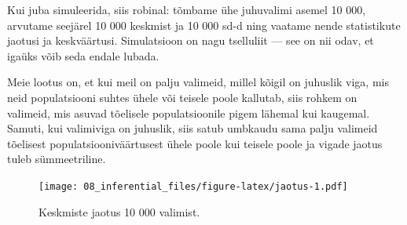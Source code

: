 \documentclass[]{book}
\newenvironment{Shaded}{\begin{snugshade}}{\end{snugshade}}
\newcommand{\CommentTok}[1]{\textcolor[rgb]{0.56,0.35,0.01}{\textit{#1}}}
\newcommand{\DataTypeTok}[1]{\textcolor[rgb]{0.13,0.29,0.53}{#1}}
\newcommand{\DecValTok}[1]{\textcolor[rgb]{0.00,0.00,0.81}{#1}}
\newcommand{\KeywordTok}[1]{\textcolor[rgb]{0.13,0.29,0.53}{\textbf{#1}}}
\newcommand{\NormalTok}[1]{#1}
\newcommand{\OperatorTok}[1]{\textcolor[rgb]{0.81,0.36,0.00}{\textbf{#1}}}
\newcommand{\StringTok}[1]{\textcolor[rgb]{0.31,0.60,0.02}{#1}}
\begin{document}
Kui juba simuleerida, siis robinal: tõmbame ühe juhuvalimi asemel 10 000, arvutame seejärel 10 000 keskmist ja 10 000 sd-d ning vaatame nende statistikute jaotusi ja keskväärtusi. Simulatsioon on nagu tselluliit --- see on nii odav, et igaüks võib seda endale lubada.

Meie lootus on, et kui meil on palju valimeid, millel kõigil on juhuslik viga, mis neid populatsiooni suhtes ühele või teisele poole kallutab, siis rohkem on valimeid, mis asuvad tõelisele populatsioonile pigem lähemal kui kaugemal. Samuti, kui valimiviga on juhuslik, siis satub umbkaudu sama palju valimeid tõelisest populatsiooniväärtusest ühele poole kui teisele poole ja vigade jaotus tuleb sümmeetriline.



\begin{Shaded}
\end{Shaded}

\begin{figure}
\centering
\texttt{[image: 08\_inferential\_files/figure-latex/jaotus-1.pdf]}
\caption{\label{fig:jaotus}Keskmiste jaotus 10 000 valimist.}
\end{figure}

\begin{Shaded}
\end{Shaded}
\end{document}
